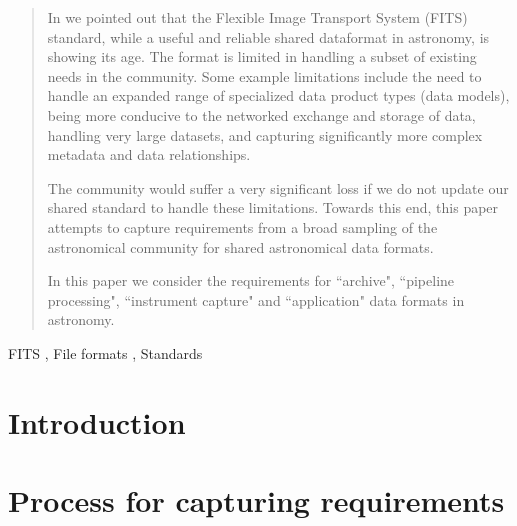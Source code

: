 \documentclass[final,authoryear,5p,times,twocolumn]{elsarticle}
\begin{document}
\begin{frontmatter}
\begin{abstract}

In  we pointed out that
the Flexible Image Transport System (FITS) standard, while a useful and
reliable shared dataformat in astronomy, is showing its age.
The format is limited in handling a subset of existing needs in the community.
Some example limitations include the need to handle an expanded range of 
specialized data product types (data models), being more conducive to the 
networked exchange and storage of data, handling very large datasets, and capturing
significantly more complex metadata and data relationships.

The community would suffer a very significant loss if we do not update our shared
standard to handle these limitations. Towards this end, this paper attempts to
capture requirements from a broad sampling of the astronomical community for 
shared astronomical data formats. 

In this paper we consider the requirements for ``archive", ``pipeline
processing", ``instrument capture"
and ``application" data formats in astronomy.

\end{abstract}

\begin{keyword}%


FITS \sep
File formats \sep
Standards
\end{keyword}

\end{frontmatter}


\newcommand{\aspconf}{ASP Conf.\ Ser}
\newcommand{\aap}{A\&A}
\newcommand{\aaps}{A\&AS}
\newcommand{\jrasc}{JRASC}
\newcommand{\qjras}{QJRAS}
\newcommand{\mnras}{MNRAS}
\newcommand{\pasp}{PASP}
\newcommand{\pasa}{PASA}
\newcommand{\apjs}{ApJS}

\section{Introduction}

\section{Process for capturing requirements}
\end{document}
